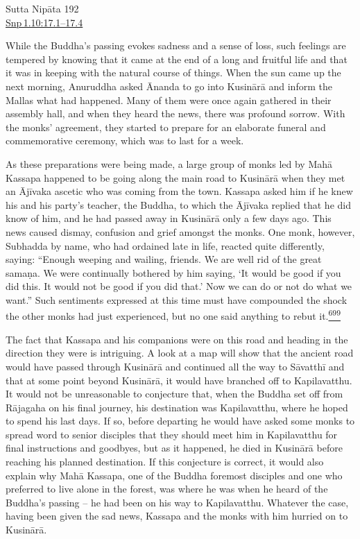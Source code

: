 Sutta Nipāta 192\\
\href{https://suttacentral.net/snp1.10/en/sujato\#17.1}{Snp\,1.10:17.1--17.4}

While the Buddha's passing evokes sadness and a sense of loss, such
feelings are tempered by knowing that it came at the end of a long and
fruitful life and that it was in keeping with the natural course of
things. When the sun came up the next morning, Anuruddha asked Ānanda to
go into Kusinārā and inform the Mallas what had happened. Many of them
were once again gathered in their assembly hall, and when they heard the
news, there was profound sorrow. With the monks' agreement, they started
to prepare for an elaborate funeral and commemorative ceremony, which
was to last for a week.

As these preparations were being made, a large group of monks led by
Mahā Kassapa happened to be going along the main road to Kusinārā when
they met an Ājīvaka ascetic who was coming from the town. Kassapa asked
him if he knew his and his party's teacher, the Buddha, to which the
Ājīvaka replied that he did know of him, and he had passed away in
Kusinārā only a few days ago. This news caused dismay, confusion and
grief amongst the monks. One monk, however, Subhadda by name, who had
ordained late in life, reacted quite differently, saying: ``Enough
weeping and wailing, friends. We are well rid of the great samaṇa. We
were continually bothered by him saying, `It would be good if you did
this. It would not be good if you did that.' Now we can do or not do
what we want.'' Such sentiments expressed at this time must have
compounded the shock the other monks had just experienced, but no one
said anything to rebut
it.\label{footprints_split_018.html_fnref699}\hyperref[footprints_split_025.htmlux5cux23fn699]{\textsuperscript{699}}

The fact that Kassapa and his companions were on this road and heading
in the direction they were is intriguing. A look at a map will show that
the ancient road would have passed through Kusinārā and continued all
the way to Sāvatthī and that at some point beyond Kusinārā, it would
have branched off to Kapilavatthu. It would not be unreasonable to
conjecture that, when the Buddha set off from Rājagaha on his final
journey, his destination was Kapilavatthu, where he hoped to spend his
last days. If so, before departing he would have asked some monks to
spread word to senior disciples that they should meet him in
Kapilavatthu for final instructions and goodbyes, but as it happened, he
died in Kusinārā before reaching his planned destination. If this
conjecture is correct, it would also explain why Mahā Kassapa, one of
the Buddha foremost disciples and one who preferred to live alone in the
forest, was where he was when he heard of the Buddha's passing -- he had
been on his way to Kapilavatthu. Whatever the case, having been given
the sad news, Kassapa and the monks with him hurried on to Kusinārā.

